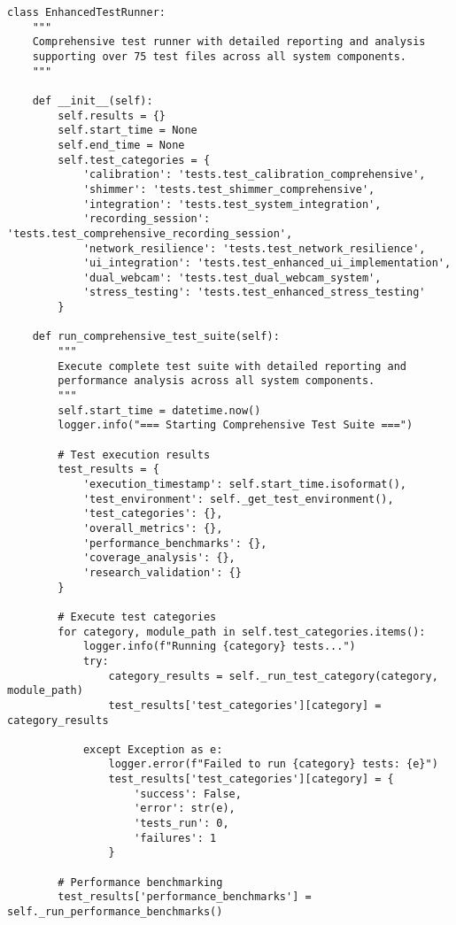 \documentclass[12pt,a4paper]{article}
\begin{document}
\begin{verbatim}
class EnhancedTestRunner:
    """
    Comprehensive test runner with detailed reporting and analysis
    supporting over 75 test files across all system components.
    """

    def __init__(self):
        self.results = {}
        self.start_time = None
        self.end_time = None
        self.test_categories = {
            'calibration': 'tests.test_calibration_comprehensive',
            'shimmer': 'tests.test_shimmer_comprehensive',
            'integration': 'tests.test_system_integration',
            'recording_session': 'tests.test_comprehensive_recording_session',
            'network_resilience': 'tests.test_network_resilience',
            'ui_integration': 'tests.test_enhanced_ui_implementation',
            'dual_webcam': 'tests.test_dual_webcam_system',
            'stress_testing': 'tests.test_enhanced_stress_testing'
        }

    def run_comprehensive_test_suite(self):
        """
        Execute complete test suite with detailed reporting and
        performance analysis across all system components.
        """
        self.start_time = datetime.now()
        logger.info("=== Starting Comprehensive Test Suite ===")

        # Test execution results
        test_results = {
            'execution_timestamp': self.start_time.isoformat(),
            'test_environment': self._get_test_environment(),
            'test_categories': {},
            'overall_metrics': {},
            'performance_benchmarks': {},
            'coverage_analysis': {},
            'research_validation': {}
        }

        # Execute test categories
        for category, module_path in self.test_categories.items():
            logger.info(f"Running {category} tests...")
            try:
                category_results = self._run_test_category(category, module_path)
                test_results['test_categories'][category] = category_results

            except Exception as e:
                logger.error(f"Failed to run {category} tests: {e}")
                test_results['test_categories'][category] = {
                    'success': False,
                    'error': str(e),
                    'tests_run': 0,
                    'failures': 1
                }

        # Performance benchmarking
        test_results['performance_benchmarks'] = self._run_performance_benchmarks()


\end{verbatim}
\end{document}
